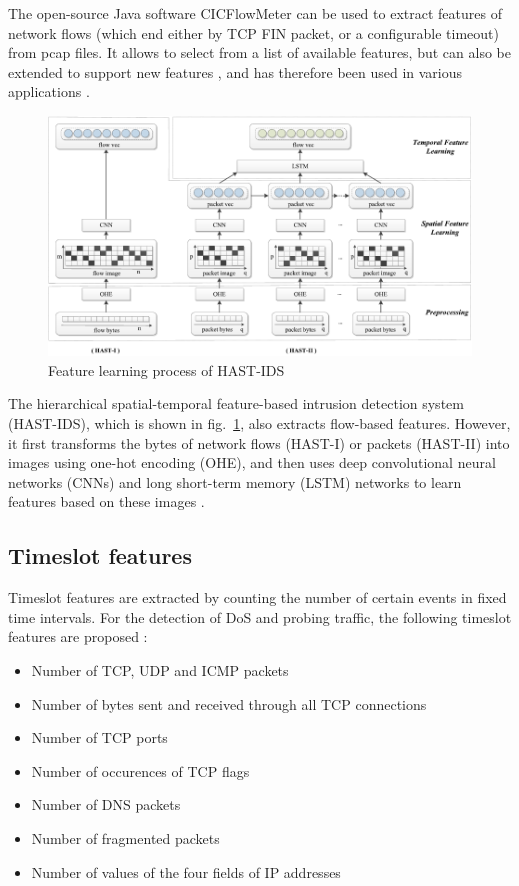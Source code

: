 \documentclass[conference]{IEEEtran}
\begin{document}
The open-source Java software CICFlowMeter can be used to extract features of network flows (which end either by TCP FIN packet, or a configurable timeout) from pcap files. It allows to select from a list of available features, but can also be extended to support new features \cite{cicflowmeter}, and has therefore been used in various applications \cite{Ids2018} \cite{lashkari2017} \cite{sopuru2019}.

\begin{figure}[htpb]
\centerline{\includegraphics[scale=0.35]{hast-ids.png}}
\caption{Feature learning process of HAST-IDS \cite{wang2018}}
\label{hast-ids}
\end{figure}

The hierarchical spatial-temporal feature-based intrusion detection system (HAST-IDS), which is shown in fig.~\ref{hast-ids}, also extracts flow-based features. However, it first transforms the bytes of network flows (HAST-I) or packets (HAST-II) into images using one-hot encoding (OHE), and then uses deep convolutional neural networks (CNNs) and long short-term memory (LSTM) networks to learn features based on these images \cite{wang2018}.

\subsection{Timeslot features}

Timeslot features are extracted by counting the number of certain events in fixed time intervals. For the detection of DoS and probing traffic, the following timeslot features are proposed \cite{waizumi2007}:
\begin{itemize}
	\item Number of TCP, UDP and ICMP packets
	\item Number of bytes sent and received through all TCP connections
	\item Number of TCP ports
	\item Number of occurences of TCP flags
	\item Number of DNS packets
	\item Number of fragmented packets
	\item Number of values of the four fields of IP addresses
\end{itemize}
\end{document}
